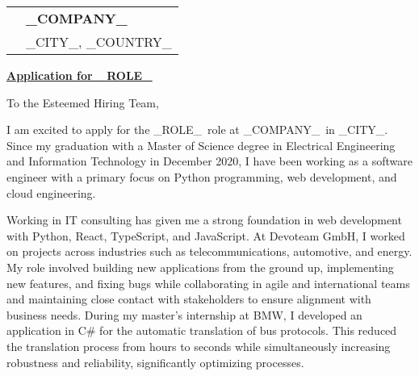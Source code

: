 \documentclass[10pt, a4paper]{article}
\begin{document}
\vspace{2.5cm}
\bigskip
\bigskip



\newcommand{\COMPANY}{_COMPANY_}
\newcommand{\ROLE}{_ROLE_}
\newcommand{\JobPostingURL}{_URL_}
\newcommand{\CITY}{_CITY_}
\newcommand{\COUNTRY}{_COUNTRY_}

\begin{tabular}{@{}p{0cm}l@{}} 
 & \textbf{\COMPANY} \\[0.8ex] 
 & \CITY, \COUNTRY
\end{tabular}

\bigskip %

\hfill {}

\noindent \textbf{\underline{Application for \href{\JobPostingURL}{\ROLE}}}


To the Esteemed Hiring Team,
\bigskip

I am excited to apply for the \ROLE\ role at \COMPANY\ in \CITY. Since my graduation with a Master of Science degree in Electrical Engineering and Information Technology in December 2020, I have been working as a software engineer with a primary focus on Python programming, web development, and cloud engineering.

Working in IT consulting has given me a strong foundation in web development with Python, React, TypeScript, and JavaScript. At Devoteam GmbH, I worked on projects across industries such as telecommunications, automotive, and energy. My role involved building new applications from the ground up, implementing new features, and fixing bugs while collaborating in agile and international teams and maintaining close contact with stakeholders to ensure alignment with business needs. During my master's internship at BMW, I developed an application in C\# for the automatic translation of bus protocols. This reduced the translation process from hours to seconds while simultaneously increasing robustness and reliability, significantly optimizing processes.
\end{document}
